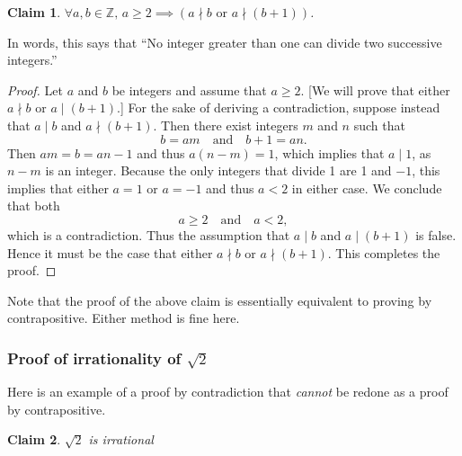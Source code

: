 \documentclass[11pt]{article}
\theoremstyle{plain}
\newtheorem*{claim}{Claim}
\theoremstyle{plain}
\theoremstyle{remark}
\def\integers{\mathbb{Z}}
\begin{document}
\begin{tcolorbox}
\begin{claim}
$ \forall a,b\in\integers,\, a\geq 2\implies (a\nmid b \text{ or }a\nmid (b+1))$.
\end{claim}
\end{tcolorbox}
In words, this says that ``No integer greater than one can divide two successive integers.'' 
\begin{proof}
 Let $a$ and $b$ be integers and assume that $a\geq 2$. [We will prove that either $a\nmid b$ or $a\mid (b+1)$.] For the sake of deriving a contradiction, suppose instead that $a\mid b$ and $a\nmid (b+1)$. Then there exist integers $m$ and $n$ such that 
 \[
  b=am\quad\text{and}\quad b+1 = an.
 \]
Then $am=b = an-1$ and thus $a(n-m) = 1$, which implies that $a\mid 1$, as $n-m$ is an integer. Because the only integers that divide 1 are 1 and $-1$, this implies that either $a=1$ or $a=-1$ and thus $a<2$ in either case. We conclude that both
\[
 a\geq2\quad\text{and}\quad a<2,
\]
which is a contradiction. Thus the assumption that $a\mid b$ and $a\mid (b+1)$ is false. Hence it must be the case that either $a\nmid b$ or $a\nmid (b+1)$. This completes the proof.
\end{proof}

Note that the proof of the above claim is essentially equivalent to proving by contrapositive. Either method is fine here.

\subsubsection*{Proof of irrationality of $\sqrt{2}$}
Here is an example of a proof by contradiction that \emph{cannot} be redone as a proof by contrapositive.

\begin{tcolorbox}
\begin{claim}
 $\sqrt 2$ is irrational
\end{claim}
\end{tcolorbox}
 
 
 
\end{document}
